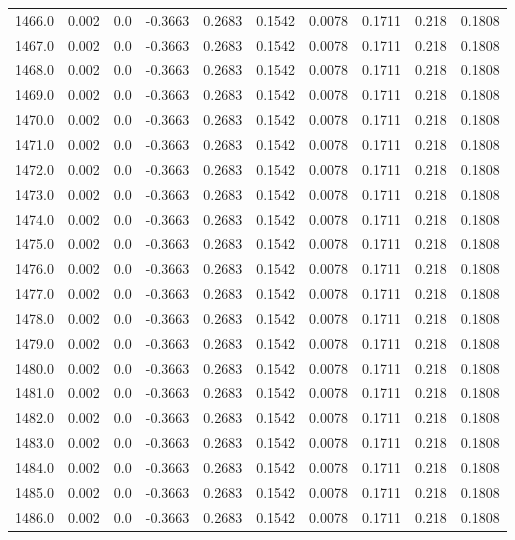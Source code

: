 \begin{longtable}{lrrrrrrrrr}
1466.0 & 0.002 & 0.0 & -0.3663 & 0.2683 & 0.1542 & 0.0078 & 0.1711 & 0.218 & 0.1808 \\
1467.0 & 0.002 & 0.0 & -0.3663 & 0.2683 & 0.1542 & 0.0078 & 0.1711 & 0.218 & 0.1808 \\
1468.0 & 0.002 & 0.0 & -0.3663 & 0.2683 & 0.1542 & 0.0078 & 0.1711 & 0.218 & 0.1808 \\
1469.0 & 0.002 & 0.0 & -0.3663 & 0.2683 & 0.1542 & 0.0078 & 0.1711 & 0.218 & 0.1808 \\
1470.0 & 0.002 & 0.0 & -0.3663 & 0.2683 & 0.1542 & 0.0078 & 0.1711 & 0.218 & 0.1808 \\
1471.0 & 0.002 & 0.0 & -0.3663 & 0.2683 & 0.1542 & 0.0078 & 0.1711 & 0.218 & 0.1808 \\
1472.0 & 0.002 & 0.0 & -0.3663 & 0.2683 & 0.1542 & 0.0078 & 0.1711 & 0.218 & 0.1808 \\
1473.0 & 0.002 & 0.0 & -0.3663 & 0.2683 & 0.1542 & 0.0078 & 0.1711 & 0.218 & 0.1808 \\
1474.0 & 0.002 & 0.0 & -0.3663 & 0.2683 & 0.1542 & 0.0078 & 0.1711 & 0.218 & 0.1808 \\
1475.0 & 0.002 & 0.0 & -0.3663 & 0.2683 & 0.1542 & 0.0078 & 0.1711 & 0.218 & 0.1808 \\
1476.0 & 0.002 & 0.0 & -0.3663 & 0.2683 & 0.1542 & 0.0078 & 0.1711 & 0.218 & 0.1808 \\
1477.0 & 0.002 & 0.0 & -0.3663 & 0.2683 & 0.1542 & 0.0078 & 0.1711 & 0.218 & 0.1808 \\
1478.0 & 0.002 & 0.0 & -0.3663 & 0.2683 & 0.1542 & 0.0078 & 0.1711 & 0.218 & 0.1808 \\
1479.0 & 0.002 & 0.0 & -0.3663 & 0.2683 & 0.1542 & 0.0078 & 0.1711 & 0.218 & 0.1808 \\
1480.0 & 0.002 & 0.0 & -0.3663 & 0.2683 & 0.1542 & 0.0078 & 0.1711 & 0.218 & 0.1808 \\
1481.0 & 0.002 & 0.0 & -0.3663 & 0.2683 & 0.1542 & 0.0078 & 0.1711 & 0.218 & 0.1808 \\
1482.0 & 0.002 & 0.0 & -0.3663 & 0.2683 & 0.1542 & 0.0078 & 0.1711 & 0.218 & 0.1808 \\
1483.0 & 0.002 & 0.0 & -0.3663 & 0.2683 & 0.1542 & 0.0078 & 0.1711 & 0.218 & 0.1808 \\
1484.0 & 0.002 & 0.0 & -0.3663 & 0.2683 & 0.1542 & 0.0078 & 0.1711 & 0.218 & 0.1808 \\
1485.0 & 0.002 & 0.0 & -0.3663 & 0.2683 & 0.1542 & 0.0078 & 0.1711 & 0.218 & 0.1808 \\
1486.0 & 0.002 & 0.0 & -0.3663 & 0.2683 & 0.1542 & 0.0078 & 0.1711 & 0.218 & 0.1808 \\

\end{longtable}
